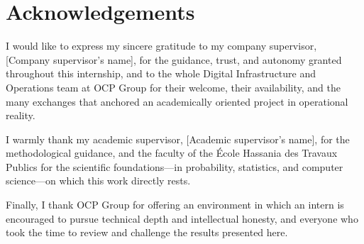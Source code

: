 \documentclass[11pt,a4paper]{report}
\newcommand{\AcademicSupervisor}{[Academic supervisor's name]}
\newcommand{\CompanySupervisor}{[Company supervisor's name]}
\begin{document}
\chapter*{Acknowledgements}
I would like to express my sincere gratitude to my company supervisor,
\CompanySupervisor, for the guidance, trust, and autonomy granted throughout
this internship, and to the whole Digital Infrastructure and Operations team
at OCP Group for their welcome, their availability, and the many exchanges
that anchored an academically oriented project in operational reality.

I warmly thank my academic supervisor, \AcademicSupervisor, for the
methodological guidance, and the faculty of the \'Ecole Hassania des Travaux
Publics for the scientific foundations---in probability, statistics, and
computer science---on which this work directly rests.

Finally, I thank OCP Group for offering an environment in which an intern is
encouraged to pursue technical depth and intellectual honesty, and everyone
who took the time to review and challenge the results presented here.
\end{document}
